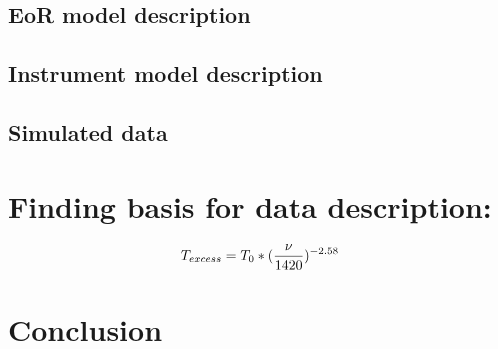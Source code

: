 \documentclass{aastex62}
\begin{document}
\subsection{EoR model description}
\subsection{Instrument model description}

\subsection{Simulated data}
\section{Finding basis for data description:} 

\label{sec:floats}

\begin{equation}
T_{excess} = T_{0}*({\nu \over 1420})^{-2.58} \\
\end{equation}

\section{Conclusion}
\end{document}
